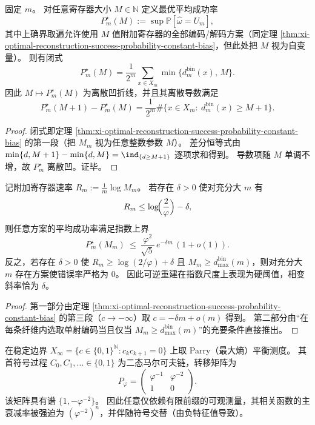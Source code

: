 \begin{proposition}\label{prop:xi-reconstruction-success-curve-discrete-derivative}
固定 \(m\)。
对任意寄存器大小 \(M\in\mathbb N\) 定义最优平均成功率
\[
P_m^\star(M):=\sup\mathbb P[\widehat\omega=U_m],
\]
其中上确界取遍允许使用 \(M\) 值附加寄存器的全部编码/解码方案（同定理 \ref{thm:xi-optimal-reconstruction-success-probability-constant-bias}，但此处把 \(M\) 视为自变量）。
则有闭式
\[
P_m^\star(M)=\frac{1}{2^m}\sum_{x\in X_m}\min\!\bigl\{d^{\mathrm{bin}}_m(x),\,M\bigr\}.
\]
因此 \(M\mapsto P_m^\star(M)\) 为离散凹折线，并且其离散导数满足
\[
P_m^\star(M+1)-P_m^\star(M)=\frac{1}{2^m}\#\{x\in X_m:\ d^{\mathrm{bin}}_m(x)\ge M+1\}.
\]
\end{proposition}

\begin{proof}
闭式即定理 \ref{thm:xi-optimal-reconstruction-success-probability-constant-bias} 的第一段（把 \(M_m\) 视为任意整数参数 \(M\)）。
差分恒等式由
\(
\min\{d,M+1\}-\min\{d,M\}=\ind_{\{d\ge M+1\}}
\)
逐项求和得到。
导数项随 \(M\) 单调不增，故 \(P_m^\star\) 离散凹。证毕。
\end{proof}

\begin{theorem}\label{thm:xi-strong-converse-exponent-below-critical-rate}
记附加寄存器速率 \(R_m:=\frac{1}{m}\log M_m\)。
若存在 \(\delta>0\) 使对充分大 \(m\) 有
\[
R_m\le \log\!\Bigl(\frac{2}{\varphi}\Bigr)-\delta,
\]
则任意方案的平均成功率满足指数上界
\[
P_m^\star(M_m)\ \le\ \frac{\varphi^2}{\sqrt5}\,e^{-\delta m}\,(1+o(1)).
\]
反之，若存在 \(\delta>0\) 使 \(R_m\ge \log(2/\varphi)+\delta\) 且 \(M_m\ge d^{\mathrm{bin}}_{\max}(m)\)，则对充分大 \(m\) 存在方案使错误率严格为 \(0\)。
因此可逆重建在指数尺度上表现为硬阈值，相变斜率恰为 \(\delta\)。
\end{theorem}

\begin{proof}
第一部分由定理 \ref{thm:xi-optimal-reconstruction-success-probability-constant-bias} 的第三段（\(c\to-\infty\)）取 \(c=-\delta m+o(m)\) 得到。
第二部分由“在每条纤维内选取单射编码当且仅当 \(M_m\ge d^{\mathrm{bin}}_{\max}(m)\)”的充要条件直接推出。
\end{proof}

\begin{proposition}\label{prop:xi-parry-symbol-markov-peripheral-spectrum}
在稳定边界 \(X_\infty=\{c\in\{0,1\}^{\mathbb N}:c_kc_{k+1}=0\}\) 上取 Parry（最大熵）平衡测度。
其首符号过程 \(C_0,C_1,\dots\in\{0,1\}\) 为二态马尔可夫链，转移矩阵为
\[
P_\varphi=
\begin{pmatrix}
\varphi^{-1} & \varphi^{-2}\\[2pt]
1 & 0
\end{pmatrix}.
\]
该矩阵具有谱 \(\{1,-\varphi^{-2}\}\)。
因此任意仅依赖有限前缀的可观测量，其相关函数的主衰减率被强迫为 \((\varphi^{-2})^{n}\)，并伴随符号交替（由负特征值导致）。
\end{proposition}


